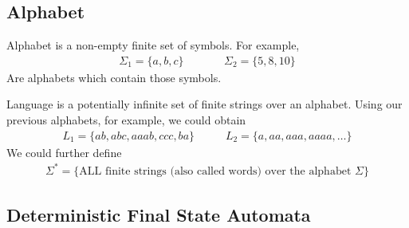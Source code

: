 \documentclass[a4paper]{article}
\theoremstyle{plain}
\theoremstyle{definition}
\newtheorem{defn}{Definition}[section]
\theoremstyle{remark}
\begin{document}
	\subsection{Alphabet}
	\begin{tcolorbox}[colback=black!3!white,colframe=black!60!white,title=\begin{defn}Alphabet \label{Alphabet}\end{defn}]
	Alphabet is a non-empty finite set of symbols. For example,
	\begin{align}
		\Sigma_1 = \{a,b,c\} \;\;\;\;\;\;\;\;\;\;\;\;\; \Sigma_2 = \{5,8,10\}
	\end{align}
	Are alphabets which contain those symbols.
	\end{tcolorbox}
	\begin{tcolorbox}[colback=black!3!white,colframe=0black!60!white,title=\begin{defn}Language \label{Language}\end{defn}]
	Language is a potentially infinite set of finite strings over an alphabet. Using our previous alphabets, for example, we could obtain
	\begin{align}
	L_1 = \{ab,abc,aaab,ccc,ba\} \;\;\;\;\;\;\;\;\;\; L_2 = \{ a,aa,aaa,aaaa,\ldots\}
	\end{align}
	We could further define
	\begin{align}
		\Sigma^{*} = \{\text{ALL finite strings (also called words) over the alphabet }\Sigma\}
	\end{align}
	\end{tcolorbox}
	\subsection{Deterministic Final State Automata}
	
\end{document}
